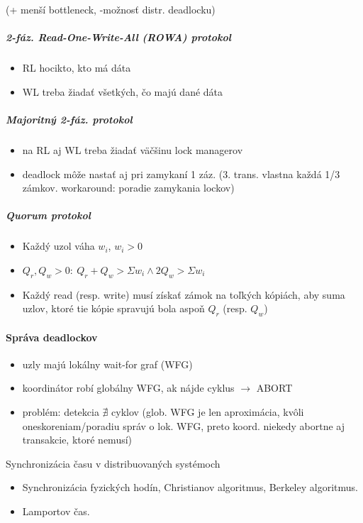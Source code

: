 \documentclass[a4paper]{report}
\begin{document}
\noindent
(+ menší bottleneck, -možnosť distr. deadlocku)

\subparagraph*{2-fáz. Read-One-Write-All (ROWA) protokol}
\begin{itemize}
 \item RL hocikto, kto má dáta
 \item WL treba žiadať všetkých, čo majú dané dáta
\end{itemize}

\subparagraph*{Majoritný 2-fáz. protokol}
\begin{itemize}
 \item na RL aj WL treba žiadať väčšinu lock managerov
 \item deadlock môže nastať aj pri zamykaní 1 záz. (3. trans. vlastna každá 1/3 zámkov. workaround: poradie zamykania lockov)
\end{itemize}

\subparagraph*{Quorum protokol}
\begin{itemize}
 \item Každý uzol váha $w_i$, $w_i > 0$
 \item $Q_r,Q_w > 0:\:Q_r + Q_w > \Sigma w_i \wedge 2 Q_w > \Sigma w_i$
 \item Každý read (resp. write) musí získať zámok na toľkých kópiách, aby suma uzlov, ktoré tie kópie spravujú bola aspoň $Q_r$ (resp. $Q_w$)
\end{itemize}

\paragraph{Správa deadlockov}
\begin{itemize}
 \item uzly majú lokálny wait-for graf (WFG)
 \item koordinátor robí globálny WFG, ak nájde cyklus $\rightarrow$ ABORT
 \item problém: detekcia $\nexists$ cyklov (glob. WFG je len aproximácia, kvôli oneskoreniam/poradiu správ o lok. WFG, preto koord. niekedy abortne aj transakcie, ktoré nemusí)
\end{itemize}

\begin{zadanie}{Synchronizácia času v distribuovaných systémoch}
\begin{itemize}
 \item Synchronizácia fyzických hodín, Christianov algoritmus, Berkeley algoritmus.
 \item Lamportov čas.
\end{itemize}
\end{zadanie}
\end{document}
